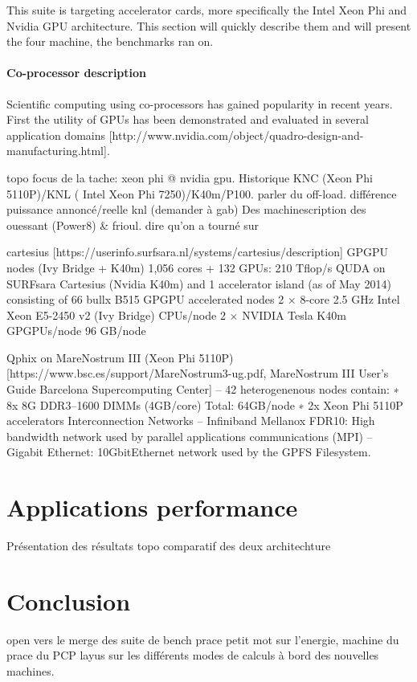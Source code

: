 This suite is targeting accelerator cards, more specifically the Intel Xeon Phi and Nvidia GPU architecture. This section will quickly describe them and will present the four machine, the benchmarks ran on.

\subsection{Co-processor description}
Scientific computing using co-processors has gained popularity in recent years. First the utility of GPUs has been demonstrated and evaluated in several application domains [http://www.nvidia.com/object/quadro-design-and-manufacturing.html]. 

topo focus de la tache: xeon phi @ nvidia gpu. Historique KNC (Xeon Phi 5110P)/KNL ( Intel Xeon Phi 7250)/K40m/P100. parler du off-load. différence puissance annoncé/reelle knl (demander à gab)
Des machinescription des ouessant (Power8) & frioul.
dire qu'on a tourné sur

cartesius [https://userinfo.surfsara.nl/systems/cartesius/description]
GPGPU nodes (Ivy Bridge + K40m) 1,056 cores + 132 GPUs: 210 Tflop/s
QUDA on SURFsara Cartesius (Nvidia K40m) and
1 accelerator island (as of May 2014) consisting of 66 bullx B515 GPGPU accelerated nodes
2 × 8-core 2.5 GHz Intel Xeon E5-2450 v2 (Ivy Bridge) CPUs/node
2 × NVIDIA Tesla K40m GPGPUs/node
96 GB/node


Qphix on MareNostrum III (Xeon Phi 5110P) [https://www.bsc.es/support/MareNostrum3-ug.pdf, MareNostrum III User’s Guide Barcelona Supercomputing Center]
– 42 heterogenenous nodes contain:
∗ 8x 8G DDR3–1600 DIMMs (4GB/core) Total: 64GB/node
∗ 2x Xeon Phi 5110P accelerators
Interconnection Networks
– Infiniband Mellanox FDR10: High bandwidth network used by parallel applications communications
(MPI)
– Gigabit Ethernet: 10GbitEthernet network used by the GPFS Filesystem.



\part{Applications performance}
Présentation des résultats
topo comparatif des deux architechture

\part*{Conclusion}
open vers le merge des suite de bench prace
petit mot sur l'energie, machine du prace du PCP
layus sur les différents modes de calculs à bord des nouvelles machines.
